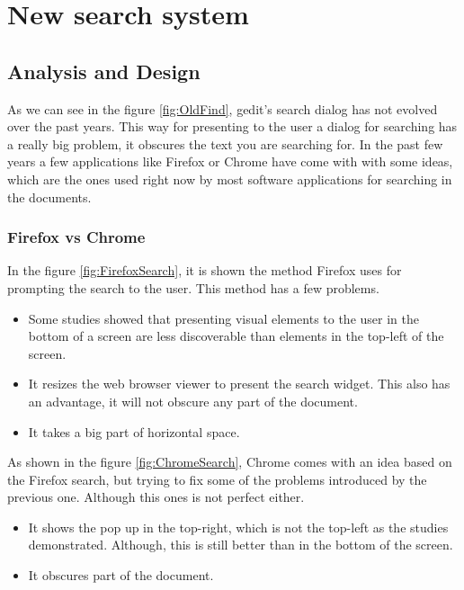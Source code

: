 
\chapter{New search system}

\section{Analysis and Design}


As we can see in the figure \ref{fig:OldFind}, gedit's search dialog has not evolved over the past years. This way for presenting to the user a dialog for searching has a really big problem, it obscures the text you are searching for. In the past few years a few applications like Firefox or Chrome have come with with some ideas, which are the ones used right now by most software applications for searching in the documents.

\subsection{Firefox vs Chrome}

In the figure \ref{fig:FirefoxSearch}, it is shown the method Firefox uses for prompting the search to the user. This method has a few problems.
\begin{itemize}
  \item Some studies showed that presenting visual elements to the user in the bottom of a screen are less discoverable than elements in the top-left of the screen.
  \item It resizes the web browser viewer to present the search widget. This also has an advantage, it will not obscure any part of the document.
  \item It takes a big part of horizontal space.
\end{itemize}


As shown in the figure \ref{fig:ChromeSearch}, Chrome comes with an idea based on the Firefox search, but trying to fix some of the problems introduced by the previous one. Although this ones is not perfect either.
\begin{itemize}
  \item It shows the pop up in the top-right, which is not the top-left as the studies demonstrated. Although, this is still better than in the bottom of the screen.
  \item It obscures part of the document.
\end{itemize}

